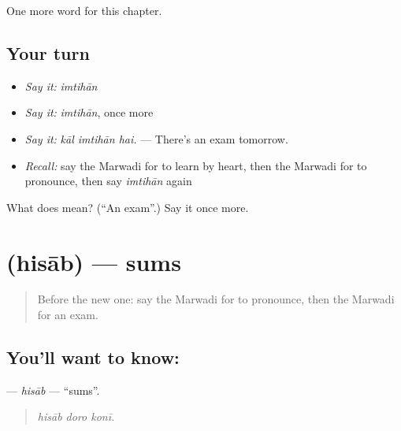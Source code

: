 \begin{grammarlens}[title={What you've built}]
One more word for this chapter.
\end{grammarlens}

\subsection*{Your turn}
\begin{itemize}
\raggedright
  \item \emph{Say it:} \emph{imtihān}
  \item \emph{Say it:} \emph{imtihān}, once more
  \item \emph{Say it:} \emph{kāl imtihān hai.} — There's an exam tomorrow.
  \item \emph{Recall:} say the Marwadi for to learn by heart, then the Marwadi for to pronounce, then say \emph{imtihān} again
\end{itemize}

\begin{tcolorbox}[breakable,colback=teal!4,colframe=teal!35!black,title={Before you move on}]
What does  mean? (\textquotedblleft{}An exam\textquotedblright{}.) Say it once more.
\end{tcolorbox}
\section[\texorpdfstring{\mw{हिसाब} (hisāb)}{हिसाब (hisāb)}]{ (hisāb) — sums}

\label{lesson:MW-C286-hisab}



\begin{quote}
Before the new one: say the Marwadi for to pronounce, then the Marwadi for an exam.
\end{quote}

\subsection*{You'll want to know: }
\textbf{} — \emph{hisāb} — \textquotedblleft{}sums\textquotedblright{}.

\begin{quote}
  
\end{quote}

\begin{quote}
\emph{hisāb doro konī.}
\end{quote}

